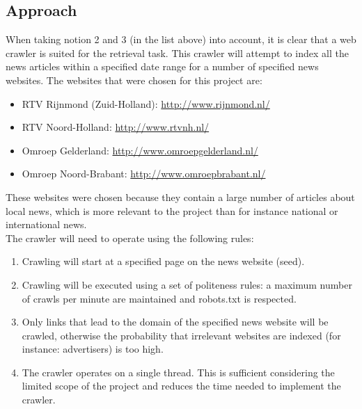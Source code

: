 \subsection*{Approach}
When taking notion 2 and 3 (in the list above) into account, it is clear that a web crawler is suited for the retrieval task. This crawler will attempt to index all the news articles within a specified date range for a number of specified news websites. The websites that were chosen for this project are:
\begin{itemize}[noitemsep]
\item RTV Rijnmond (Zuid-Holland): \url{http://www.rijnmond.nl/}
\item RTV Noord-Holland: \url{http://www.rtvnh.nl/}
\item Omroep Gelderland: \url{http://www.omroepgelderland.nl/}
\item Omroep Noord-Brabant: \url{http://www.omroepbrabant.nl/}
\end{itemize}
These websites were chosen because they contain a large number of articles about local news, which is more relevant to the project than for instance national or international news.\\
The crawler will need to operate using the following rules:
\begin{enumerate}
\item Crawling will start at a specified page on the news website (seed).
\item Crawling will be executed using a set of politeness rules: a maximum number of crawls per minute are maintained and robots.txt is respected.
\item Only links that lead to the domain of the specified news website will be crawled, otherwise the probability that irrelevant websites are indexed (for instance: advertisers) is too high.
\item The crawler operates on a single thread. This is sufficient considering the limited scope of the project and reduces the time needed to implement the crawler.
\end{enumerate}
